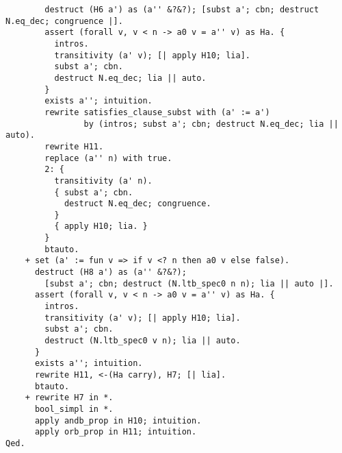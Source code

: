 \documentclass{article}
\begin{document}
\begin{verbatim}
        destruct (H6 a') as (a'' &?&?); [subst a'; cbn; destruct N.eq_dec; congruence |].
        assert (forall v, v < n -> a0 v = a'' v) as Ha. {
          intros.
          transitivity (a' v); [| apply H10; lia].
          subst a'; cbn.
          destruct N.eq_dec; lia || auto.
        }
        exists a''; intuition.
        rewrite satisfies_clause_subst with (a' := a')
                by (intros; subst a'; cbn; destruct N.eq_dec; lia || auto).
        rewrite H11.
        replace (a'' n) with true.
        2: {
          transitivity (a' n).
          { subst a'; cbn.
            destruct N.eq_dec; congruence.
          }
          { apply H10; lia. }
        }
        btauto.
    + set (a' := fun v => if v <? n then a0 v else false).
      destruct (H8 a') as (a'' &?&?);
        [subst a'; cbn; destruct (N.ltb_spec0 n n); lia || auto |].
      assert (forall v, v < n -> a0 v = a'' v) as Ha. {
        intros.
        transitivity (a' v); [| apply H10; lia].
        subst a'; cbn.
        destruct (N.ltb_spec0 v n); lia || auto.
      }
      exists a''; intuition.
      rewrite H11, <-(Ha carry), H7; [| lia].
      btauto.
    + rewrite H7 in *.
      bool_simpl in *.
      apply andb_prop in H10; intuition.
      apply orb_prop in H11; intuition.
Qed.
\end{verbatim} 
\end{document}
